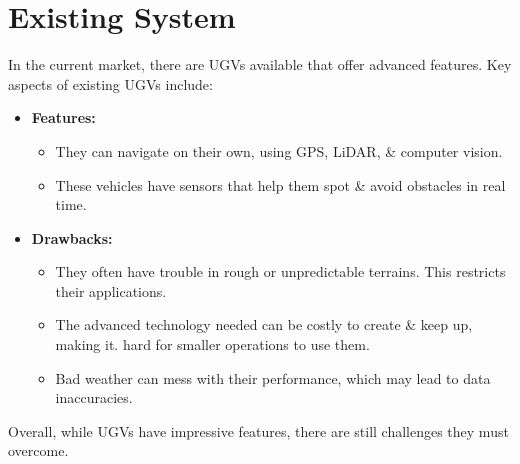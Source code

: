\section{\fontsize{14}{16} Existing System} \label{sec:sec2}
{
	\fontsize{12}{14}
	 In the current market, there are UGVs available that offer advanced features. Key aspects of existing UGVs include:
		\begin{itemize}
			\item \textbf{Features:}
				\begin{itemize}
					\item They can navigate on their own, using GPS, LiDAR, \& computer vision.
					\item These vehicles have sensors that help them spot \& avoid obstacles in real time.
				\end{itemize}
			\item \textbf{Drawbacks:}
				\begin{itemize}
					\item They often have trouble in rough or unpredictable terrains. This restricts their applications.
					\item The advanced technology needed can be costly to create \& keep up, making it.
					hard for smaller operations to use them.
					\item Bad weather can mess with their performance, which may lead to data
					inaccuracies.
				\end{itemize}
		\end{itemize}
		
	Overall, while UGVs have impressive features, there are still challenges they must overcome.

}

